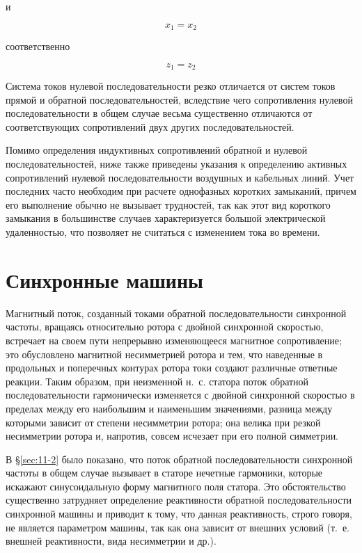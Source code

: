 и

\begin{equation*}
	x_1 = x_2
\end{equation*}

соответственно

\begin{equation*}
	z_1 = z_2
\end{equation*}

Система токов нулевой последовательности резко отличается от систем токов прямой и обратной последовательностей, вследствие чего сопротивления нулевой последовательности в общем случае весьма существенно отличаются от соответствующих сопротивлений двух других последовательностей.

Помимо определения индуктивных сопротивлений обратной и нулевой последовательностей, ниже также приведены указания к определению активных сопротивлений нулевой последовательности воздушных и кабельных линий. Учет последних часто необходим при расчете однофазных коротких замыканий, причем его выполнение обычно не вызывает трудностей, так как этот вид короткого замыкания в большинстве случаев характеризуется большой электрической удаленностью, что позволяет не считаться с изменением тока во времени.

\section{Синхронные машины}
\label{sec:12-2}

Магнитный поток, созданный токами обратной последовательности синхронной частоты, вращаясь относительно ротора с двойной синхронной скоростью, встречает на своем пути непрерывно изменяющееся магнитное сопротивление; это обусловлено магнитной несимметрией ротора и тем, что наведенные в продольных и поперечных контурах ротора токи создают различные ответные реакции. Таким образом, при неизменной н.~с. статора поток обратной последовательности гармонически изменяется с двойной синхронной скоростью в пределах между его наибольшим и наименьшим значениями, разница между которыми зависит от степени несимметрии ротора; она велика при резкой несимметрии ротора и, напротив, совсем исчезает при его полной симметрии.

В §\ref{sec:11-2} было показано, что поток обратной последовательности синхронной частоты в общем случае вызывает в статоре нечетные гармоники, которые искажают синусоидальную форму магнитного поля статора. Это обстоятельство существенно затрудняет определение реактивности обратной последовательности синхронной машины и приводит к тому, что данная реактивность, строго говоря, не является параметром машины, так как она зависит от внешних условий (т.~е. внешней реактивности, вида несимметрии и др.).

